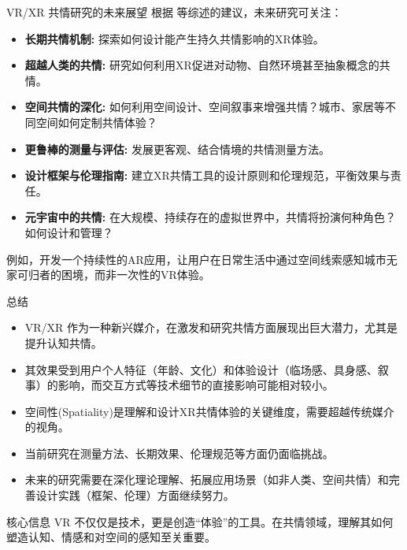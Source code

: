 \documentclass[aspectratio=169,xcolor=dvipsnames]{beamer}
\begin{document}
\begin{frame}{VR/XR 共情研究的未来展望}
    根据 \cite{paananen2022digital} 等综述的建议，未来研究可关注：
    \begin{itemize}
        \item \textbf{长期共情机制:} 探索如何设计能产生持久共情影响的XR体验。
        \item \textbf{超越人类的共情:} 研究如何利用XR促进对动物、自然环境甚至抽象概念的共情。
        \item \textbf{空间共情的深化:} 如何利用空间设计、空间叙事来增强共情？城市、家居等不同空间如何定制共情体验？
        \item \textbf{更鲁棒的测量与评估:} 发展更客观、结合情境的共情测量方法。
        \item \textbf{设计框架与伦理指南:} 建立XR共情工具的设计原则和伦理规范，平衡效果与责任。
        \item \textbf{元宇宙中的共情:} 在大规模、持续存在的虚拟世界中，共情将扮演何种角色？如何设计和管理？
    \end{itemize}
    \begin{examples}
        例如，开发一个持续性的AR应用，让用户在日常生活中通过空间线索感知城市无家可归者的困境，而非一次性的VR体验。
    \end{examples}
\end{frame}

\begin{frame}{总结}
    \begin{itemize}
        \item VR/XR 作为一种新兴媒介，在\alert{激发和研究共情}方面展现出巨大潜力，尤其是提升\alert{认知共情}。
        \item 其效果受到用户个人特征（年龄、文化）和体验设计（临场感、具身感、叙事）的影响，而交互方式等技术细节的直接影响可能相对较小。
        \item \alert{空间性(Spatiality)}是理解和设计XR共情体验的关键维度，需要超越传统媒介的视角。
        \item 当前研究在测量方法、长期效果、伦理规范等方面仍面临挑战。
        \item 未来的研究需要在深化理论理解、拓展应用场景（如非人类、空间共情）和完善设计实践（框架、伦理）方面继续努力。
    \end{itemize}
    \begin{alertblock}{核心信息}
    VR 不仅仅是技术，更是创造“体验”的工具。在共情领域，理解其如何塑造认知、情感和对空间的感知至关重要。
    \end{alertblock}
\end{frame}
\end{document}
